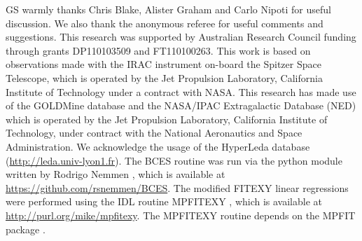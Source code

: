 \documentclass[preprint2]{emulateapj}
\begin{document}





\acknowledgments
GS warmly thanks Chris Blake, Alister Graham and Carlo Nipoti for useful discussion. 
We also thank the anonymous referee for useful comments and suggestions. 
This research was supported by Australian Research Council funding through grants
DP110103509 and FT110100263.
This work is based on observations made with the IRAC instrument \citep{fazio2004IRAC} 
on-board the Spitzer Space Telescope, 
which is operated by the Jet Propulsion Laboratory, 
California Institute of Technology under a contract with NASA.
This research has made use of the GOLDMine database \citep{goldmine} and the NASA/IPAC Extragalactic Database (NED) 
which is operated by the Jet Propulsion Laboratory, California Institute of Technology, 
under contract with the National Aeronautics and Space Administration. 
We acknowledge the usage of the HyperLeda database (\url{http://leda.univ-lyon1.fr}).
The BCES routine \citep{akritasbershady1996} was run via the python module 
written by Rodrigo Nemmen \citep{nemmen2012}, which is available at \url{https://github.com/rsnemmen/BCES}.
The modified FITEXY linear regressions were performed using the IDL routine MPFITEXY \citep{williams2010}, 
which is available at \url{http://purl.org/mike/mpfitexy}. 
The MPFITEXY routine depends on the MPFIT package \citep{markwardt2009}.





\clearpage
\end{document}
